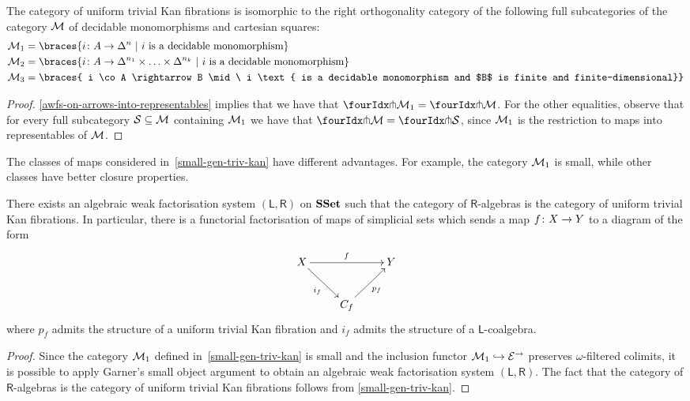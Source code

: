 \documentclass[reqno,10pt,a4paper,oneside]{amsart}
\begin{document}
\begin{theorem} \label{small-gen-triv-kan}
The category of uniform trivial Kan fibrations is isomorphic to the right orthogonality 
category of the following full subcategories of  the category $\cal{M}$ of decidable
monomorphisms and cartesian squares:
\begin{align*}
\cal{M}_1 & = \braces{i \co A \rightarrow \Delta^{n} \ | \ i \text{ is a  decidable monomorphism} } \\ 
\cal{M}_2  & = \braces{i \co A \rightarrow \Delta^{n_1} \times \ldots \times \Delta^{n_k} 
\ | \ i \text{ is a  decidable monomorphism} }  \\
\cal{M}_3  & = \braces{ i \co A \rightarrow B \mid \ i \text{ is a decidable monomorphism and 
$B$ is finite and finite-dimensional}} 
\end{align*}
\end{theorem}

\begin{proof}    \cref{awfs-on-arrows-into-representables} implies that we have that $\liftr{\cal{M}_1}  = \liftr{\cal{M}}$.
For the other equalities, observe that for every full subcategory $\cal{S} \subseteq \cal{M}$ containing $\cal{M}_1$ we have that $\liftr{\cal{M}} = \liftr{\cal{S}}$, since $\cal{M}_1$ is the restriction to maps into representables  of $\cal{M}$. 
\end{proof}

The classes of maps considered in~\cref{small-gen-triv-kan} have different advantages. For example, 
the category $\cal{M}_1$ is small, while other classes have better closure properties. 




\begin{corollary} There exists an algebraic weak factorisation system $(\mathsf{L}, \mathsf{R})$ on
$\SSet$ such that the category of $\mathsf{R}$-algebras is the category of uniform trivial Kan fibrations. 
In particular, there is a functorial factorisation of maps of simplicial sets which sends
a map $f \co X \to Y$ to a diagram of the form
\[
\xymatrix{ 
X \ar[rr]^f \ar[dr]_{i_f}  & & Y \\
 & C_f \ar[ur]_{p_f} }
 \]
 where $p_f$ admits the structure of  a uniform trivial Kan fibration and 
 $i_f$ admits the structure of a $\mathsf{L}$-coalgebra.
\end{corollary}

\begin{proof} Since the category $\cal{M}_1$ defined in~\cref{small-gen-triv-kan} is small and
the inclusion functor $\cal{M}_1 \hookrightarrow \catE^\to$ preserves $\omega$-filtered colimits, 
it is possible to apply Garner's small object argument to
obtain an algebraic weak factorisation system $(\mathsf{L}, \mathsf{R})$.
The fact that the category of $\mathsf{R}$-algebras is the category of uniform trivial Kan fibrations
 follows from \cref{small-gen-triv-kan}.
 \end{proof} 
\end{document}
